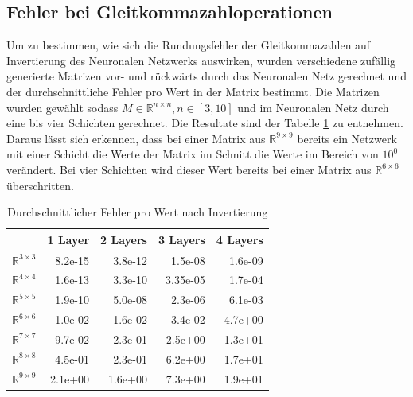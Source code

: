 \documentclass[Interploate_hadwritten_Digits.tex]{subfiles}
\begin{document}
	\subsection{Fehler bei Gleitkommazahloperationen}
	\label{sec:results_error_inverse}
	Um zu bestimmen, wie sich die Rundungsfehler der Gleitkommazahlen auf Invertierung des Neuronalen Netzwerks auswirken, wurden verschiedene zufällig generierte Matrizen vor- und rückwärts durch das Neuronalen Netz gerechnet und der durchschnittliche Fehler pro Wert in der Matrix bestimmt. Die Matrizen wurden gewählt sodass $ M \in \mathbb{R}^{n \times n}, n \in [3, 10] $ und im Neuronalen Netz durch eine bis vier Schichten gerechnet. Die Resultate sind der Tabelle \ref{tbl:reverse_error} zu entnehmen. Daraus lässt sich erkennen, dass bei einer Matrix aus $ \mathbb{R}^{9 \times 9} $ bereits ein Netzwerk mit einer Schicht die Werte der Matrix im Schnitt die Werte im Bereich von $ 10^{0} $ verändert. Bei vier Schichten wird dieser Wert bereits bei einer Matrix aus $ \mathbb{R}^{6 \times 6} $ überschritten.
	\begin{table}[H]
		\centering
		\begin{tabular}{|l|r|r|r|r|}
			\hline
			 & 1 Layer & 2 Layers & 3 Layers & 4 Layers  \\ \hline
			$ \mathbb{R}^{3 \times 3} $ & 8.2e-15 & 3.8e-12 & 1.5e-08 & 1.6e-09 \\ \hline
			$ \mathbb{R}^{4 \times 4} $ & 1.6e-13 & 3.3e-10 & 3.35e-05 & 1.7e-04 \\ \hline
			$ \mathbb{R}^{5 \times 5} $ & 1.9e-10 & 5.0e-08 & 2.3e-06 & 6.1e-03 \\ \hline
			$ \mathbb{R}^{6 \times 6} $ & 1.0e-02 & 1.6e-02 & 3.4e-02 & 4.7e+00 \\ \hline
			$ \mathbb{R}^{7 \times 7} $ & 9.7e-02 & 2.3e-01 & 2.5e+00 & 1.3e+01 \\ \hline
			$ \mathbb{R}^{8 \times 8} $ & 4.5e-01 & 2.3e-01 & 6.2e+00 & 1.7e+01 \\ \hline
			$ \mathbb{R}^{9 \times 9} $ & 2.1e+00 & 1.6e+00 & 7.3e+00 & 1.9e+01 \\ \hline
		\end{tabular}
		\caption{Durchschnittlicher Fehler pro Wert nach Invertierung}
		\label{tbl:reverse_error}
	\end{table}	
	
\end{document}
